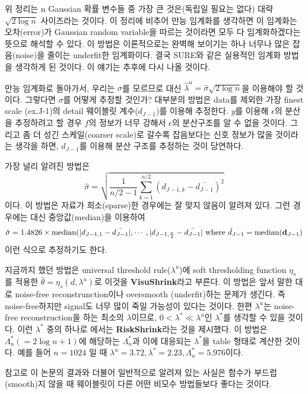 \documentclass[b5paper,]{scrbook}
\theoremstyle{plain}
\theoremstyle{definition}
\numberwithin{equation}{section}
\begin{document}
위 정리는 n Gaussian 확률 변수들 중 가장 큰 것은(독립일 필요는 없다)
대략 \(\sqrt{2 \log n}\) 사이즈라는 것이다. 이 정리에 비추어 만능
임계화를 생각하면 이 임계화는 오차(error)가 Gaussian random variable을
따르는 것이라면 모두 다 임계화하겠다는 뜻으로 해석할 수 있다. 이 방법은
이론적으로는 완벽해 보이기는 하나 너무나 많은 잡음(noise)을 줄이는
underfit한 임계화이다. 결국 SURE와 같은 실용적인 임계화 방법을 생각하게
된 것이다. 이 얘기는 추후에 다시 나올 것이다.

만능 임계화로 돌아가서, 우리는 \(\sigma\)를 모르므로 대신
\(\hat{\lambda}^{u}=\hat{\sigma}\sqrt{2 \log n}\)을 이용해야 할 것이다.
그렇다면 \(\sigma\)를 어떻게 추정할 것인가? 대부분의 방법은 data를
제외한 가장 finest scale (ex.J-1)의 detail 웨이블릿 계수(\(d_{J-1}\))를
이용해 추정한다. \(y\)를 이용해 \(\epsilon\)의 분산을 추정하려고 할 경우
\(f\)의 정보가 너무 강해서 \(\epsilon\)의 분산구조를 알 수 없을 것이다.
그리고 좀 더 성긴 스케일(coarser scale)로 갈수록 잡음보다는 신호 정보가
많을 것이라는 생각을 하면, \(d_{J-1}\)를 이용해 분산 구조를 추정하는
것이 당연하다.

가장 널리 알려진 방법은
\[\hat{\sigma}=\sqrt{\frac{1}{n/2-1}\sum_{k=1}^{n/2}(d_{J-1,k}-\bar{d_{J-1}})^{2}}\]
이다. 이 방법은 자료가 희소(sparse)한 경우에는 잘 맞지 않음이 알려져
있다. 그런 경우에는 대신 중앙값(median)을 이용하여 \[
\hat{\sigma}=1.4826 \times \text{median}(|d_{J-1,1}-\tilde{d_{J-1}}|,\cdots,|d_{J-1,\frac{n}{2}}-\tilde{d_{J-1}}|\\
\text{ where } \tilde{d}_{J-1}=\text{median}(\mathbf{d}_{J-1})
\] 이런 식으로 추정하기도 한다.

지금까지 했던 방법은 universal threshold rule(\(\lambda^{u}\))에 soft
thresholding function \(\eta_{s}\)를 적용한
\(\hat{\theta}=\eta_{s}(d,\lambda^{u})\)로 이것을
\textbf{VisuShrink}라고 부른다. 이 방법은 앞서 말한 대로 noise-free
reconstrunction이나 oversmooth (underfit)하는 문제가 생긴다. 즉
noise-free하지만 signal도 너무 많이 죽일 가능성이 있다는 것이다. 한편
\(\lambda^{u}\)는 noise-free reconstruction을 하는 최소의
\(\lambda\)이므로, \(0< \lambda^{*} \ll \lambda^{u}\)인
\(\lambda^{*}\)를 생각할 수 있을 것이다. 이런 \(\lambda^{*}\) 중의
하나로 \citep{Donoho1994}에서는 \textbf{RiskShrink}라는 것을 제시했다.
이 방법은 \(\Lambda_{n}^{*}(=2 \log n +1)\)에 해당하는
\(\Lambda_{n}^{*}\)과 이에 대응되는 \(\lambda^{*}\)을 table 형태로
계산한 것이다. 예를 들어 \(n=1024\) 일 때
\(\lambda^{u}=3.72, \lambda^{*}=2.23, \Lambda_{n}^{*}=5.976\)이다.

참고로 이 논문의 결과와 더불어 일반적으로 알려져 있는 사실은 함수가
부드럽(smooth)지 않을 때 웨이블릿이 다른 어떤 비모수 방법들보다 좋다는
것이다.
\end{document}

